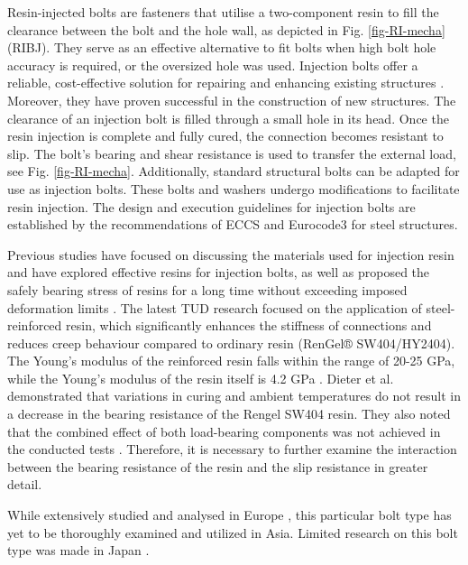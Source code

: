  Resin-injected bolts are fasteners that utilise a two-component resin to fill the clearance between the bolt and the hole wall, as depicted in Fig. \ref{fig-RI-mecha} (\ac{RIBJ}). They serve as an effective alternative to fit bolts when high bolt hole accuracy is required, or the oversized hole was used. Injection bolts offer a reliable, cost-effective solution for repairing and enhancing existing structures \cite{gresnigt1996injbolt}. Moreover, they have proven successful in the construction of new structures. The clearance of an injection bolt is filled through a small hole in its head. Once the resin injection is complete and fully cured, the connection becomes resistant to slip. The bolt's bearing and shear resistance is used to transfer the external load, see  Fig. \ref{fig-RI-mecha}. Additionally, standard structural bolts can be adapted for use as injection bolts. These bolts and washers undergo modifications to facilitate resin injection. The design and execution guidelines for injection bolts are established by the recommendations of ECCS \cite{eccs1985} and Eurocode3 \cite{eurocode3-21,en1090-2-2018} for steel structures.
 
Previous studies have focused on discussing the materials used for injection resin and have explored effective resins for injection bolts, as well as proposed the safely bearing stress of resins for a long time without exceeding imposed deformation limits \cite{kolstein2017injbolt-mec}. The latest TUD research focused on the application of steel-reinforced resin, which significantly enhances the stiffness of connections and reduces creep behaviour compared to ordinary resin (RenGel® SW404/HY2404). The Young's modulus of the reinforced resin falls within the range of 20-25 GPa, while the Young's modulus of the resin itself is 4.2 GPa \cite{nijgh_new_2017}. Dieter et al. demonstrated that variations in curing and ambient temperatures do not result in a decrease in the bearing resistance of the Rengel SW404 resin. They also noted that the combined effect of both load-bearing components was not achieved in the conducted tests \cite{ungermann2023injbolt-mec}. Therefore, it is necessary to further examine the interaction between the bearing resistance of the resin and the slip resistance in greater detail.

While extensively studied and analysed in Europe \cite{gresnigt1996injbolt, kolstein2017injbolt-mec, ungermann2023injbolt-mec, pedrosa2020injbolt-fati, pedrosa2022injbolt-mec,pedrosa2021injbolt-fati,gresnigt2000injtbolt-use}, this particular bolt type has yet to be thoroughly examined and utilized in Asia. Limited research on this bolt type was made in Japan \cite{Yaegaki2018}.

